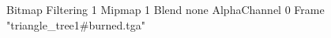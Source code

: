 {Bitmap
	{Filtering 1}
	{Mipmap 1}
	{Blend none}
	{AlphaChannel 0}
	{Frame "triangle_tree1#burned.tga"}
}
